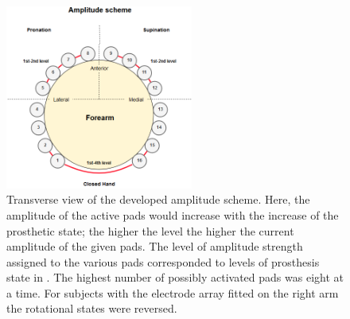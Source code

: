 \begin{figure}[H]                 
	\includegraphics[width=0.55\textwidth]{figures/El_array_amplitude}  
	\caption{Transverse view of the developed amplitude scheme. Here, the amplitude of the active pads would increase with the increase of the prosthetic state; the higher the level the higher the current amplitude of the given pads. The level of amplitude strength assigned to the various pads corresponded to levels of prosthesis state in . The highest number of possibly activated pads was eight at a time.  For subjects with the electrode array fitted on the right arm the rotational states were reversed.}
	\label{fig:amplitude} 
\end{figure}






